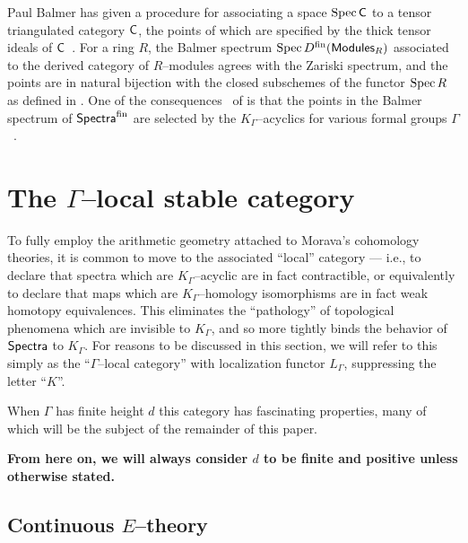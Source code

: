 \begin{remark}
Paul Balmer has given a procedure for associating a space $\operatorname{Spec} \mathsf{C}$ to a tensor triangulated category $\mathsf{C}$, the points of which are specified by the thick tensor ideals of $\mathsf{C}$~\cite{Balmer}.  For a ring $R$, the Balmer spectrum $\operatorname{Spec} D^{\text{fin}}(\mathsf{Modules}_R)$ associated to the derived category of $R$--modules agrees with the Zariski spectrum, and the points are in natural bijection with the closed subschemes of the functor $\operatorname{Spec} R$ as defined in .  One of the consequences~\cite[Theorem 7]{HopkinsSmith} of  is that the points in the Balmer spectrum of $\mathsf{Spectra}^{\text{fin}}$ are selected by the $K_\Gamma$--acyclics for various formal groups $\Gamma$~\cite[Corollary 9.5]{Balmer}.
\end{remark}




\section{The $\Gamma$--local stable category}\label{KLocalCategory}

To fully employ the arithmetic geometry attached to Morava's cohomology theories, it is common to move to the associated ``local'' category --- i.e., to declare that spectra which are $K_\Gamma$--acyclic are in fact contractible, or equivalently to declare that maps which are $K_\Gamma$--homology isomorphisms are in fact weak homotopy equivalences.  This eliminates the ``pathology'' of topological phenomena which are invisible to $K_\Gamma$, and so more tightly binds the behavior of $\mathsf{Spectra}$ to $K_\Gamma$.  For reasons to be discussed in this section, we will refer to this simply as the ``$\Gamma$--local category'' with localization functor $L_\Gamma$, suppressing the letter ``$K$''.

When $\Gamma$ has finite height $d$ this category has fascinating properties, many of which will be the subject of the remainder of this paper.

\begin{center}
\textbf{From here on, we will always consider $d$ to be finite and positive unless otherwise stated.}
\end{center}

\subsection{Continuous $E$--theory}\label{sec:ContinuousEThy}

